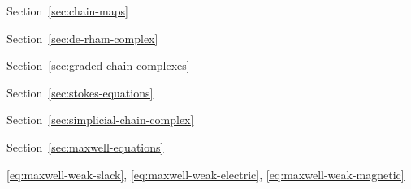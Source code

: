 \par\noindent\hspace*{0em}\label{index:map}

\par\noindent\hspace*{1em}\label{index:map-chain}\quad Section~\ref{sec:chain-maps}

\par\noindent\hspace*{1em}\label{index:map-de-rham}\quad Section~\ref{sec:de-rham-complex}

\par\noindent\hspace*{1em}\label{index:map-graded}\quad Section~\ref{sec:graded-chain-complexes}

\par\noindent\hspace*{0em}\label{index:mass-conservation}\quad Section~\ref{sec:stokes-equations}

\par\noindent\hspace*{0em}\label{index:matrix-incidence}\quad Section~\ref{sec:simplicial-chain-complex}

\par\noindent\hspace*{0em}\label{index:maxwell-s-equations}\quad Section~\ref{sec:maxwell-equations}

\par\noindent\hspace*{1em}\label{index:maxwell-s-equations-weak-formulation}\quad \eqref{eq:maxwell-weak-slack}, \eqref{eq:maxwell-weak-electric}, \eqref{eq:maxwell-weak-magnetic}

